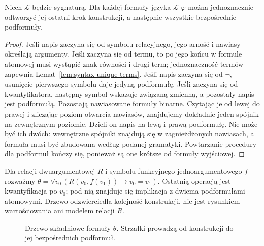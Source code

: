 \begin{lemat}\label{lem:syntax-unique-formulas}
Niech $\mathcal L$ będzie sygnaturą. Dla każdej formuły języka $\mathcal L$ $\varphi$ można jednoznacznie odtworzyć jej ostatni
krok konstrukcji, a następnie wszystkie bezpośrednie podformuły.
\end{lemat}
\begin{proof}
Jeśli napis zaczyna się od symbolu relacyjnego, jego arność i nawiasy
określają argumenty. Jeśli zaczyna się od termu, to po jego końcu
w formule atomowej musi wystąpić znak równości i drugi term; jednoznaczność
termów zapewnia Lemat~\ref{lem:syntax-unique-terms}.
Jeśli napis zaczyna się od $\neg$, usunięcie pierwszego symbolu daje
jedyną podformułę. Jeśli zaczyna się od kwantyfikatora, następny symbol
wskazuje związaną zmienną, a pozostały napis jest podformułą.
Pozostają nawiasowane formuły binarne. Czytając je od lewej do prawej
i zliczając poziom otwarcia nawiasów, znajdujemy dokładnie jeden
spójnik na zewnętrznym poziomie. Dzieli on napis na lewą i prawą
podformułę. Nie może być ich dwóch: wewnętrzne spójniki znajdują
się w zagnieżdżonych nawiasach, a formuła musi być zbudowana według
podanej gramatyki. Powtarzanie procedury dla podformuł kończy się,
ponieważ są one krótsze od formuły wyjściowej.
\end{proof}

\begin{przyklad}\label{ex:syntax-formula-tree-xlv}
Dla relacji dwuargumentowej $R$ i symbolu funkcyjnego
jednoargumentowego $f$ rozważmy
$\theta=\forall v_0\,(R(v_0,f(v_1))\to v_0=v_1)$.
Ostatnią operacją jest kwantyfikacja po $v_0$; pod nią
znajduje się implikacja z dwiema podformułami atomowymi.
Drzewo odzwierciedla kolejność konstrukcji, nie jest
rysunkiem wartościowania ani modelem relacji $R$.
\end{przyklad}
\begin{figure}[htbp]
\centering
{}
\caption{Drzewo składniowe formuły $\theta$. Strzałki prowadzą
od konstrukcji do jej bezpośrednich podformuł.}
\label{fig:syntax-tree-xlv}
\end{figure}

